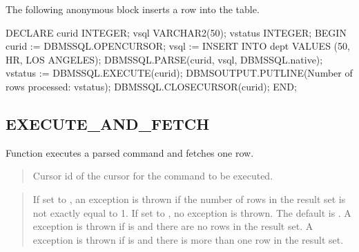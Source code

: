 \documentclass[letterpaper,10pt,english,openany,oneside]{sphinxmanual}
\begin{document}

The following anonymous block inserts a row into the  table.

%
\begin{sphinxVerbatim}[commandchars=\\\{\}]
DECLARE
    curid           INTEGER;
    v\PYGZus{}sql           VARCHAR2(50);
    v\PYGZus{}status        INTEGER;
BEGIN
    curid := DBMS\PYGZus{}SQL.OPEN\PYGZus{}CURSOR;
    v\PYGZus{}sql := \PYGZsq{}INSERT INTO dept VALUES (50, \PYGZsq{}\PYGZsq{}HR\PYGZsq{}\PYGZsq{}, \PYGZsq{}\PYGZsq{}LOS ANGELES\PYGZsq{}\PYGZsq{})\PYGZsq{};
    DBMS\PYGZus{}SQL.PARSE(curid, v\PYGZus{}sql, DBMS\PYGZus{}SQL.native);
    v\PYGZus{}status := DBMS\PYGZus{}SQL.EXECUTE(curid);
    DBMS\PYGZus{}OUTPUT.PUT\PYGZus{}LINE(\PYGZsq{}Number of rows processed: \PYGZsq{} \textbar{}\textbar{} v\PYGZus{}status);
    DBMS\PYGZus{}SQL.CLOSE\PYGZus{}CURSOR(curid);
END;
\end{sphinxVerbatim}

\newpage


\subsection{EXECUTE\_AND\_FETCH}
\label{\detokenize{execute_and_fetch::doc}}\label{\detokenize{execute_and_fetch:execute-and-fetch}}
Function  executes a parsed  command and
fetches one row.
\begin{quote}

\begin{quote}

\end{quote}
\end{quote}


\begin{quote}

Cursor id of the cursor for the  command to be executed.
\end{quote}

\begin{quote}

If set to , an exception is thrown if the number of rows in the
result set is not exactly equal to 1. If set to , no exception is
thrown. The default is . A  exception is thrown if
 is  and there are no rows in the result set. A
 exception is thrown if  is  and there is more
than one row in the result set.
\end{quote}
\end{document}
